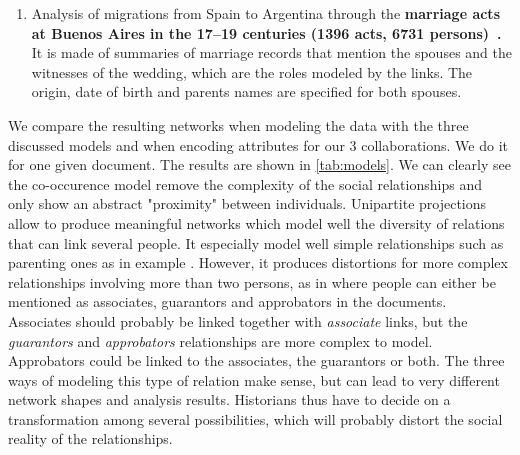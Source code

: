\begin{enumerate}[nosep,leftmargin=*]
    \item Analysis of migrations from Spain to Argentina through the \textbf{marriage acts at Buenos Aires in the 17--19 centuries (1396 acts, 6731 persons)~\cite{moutoukias2016buenos, rueda1989matrimonios}.}
    It is made of summaries of marriage records that mention the spouses and the witnesses of the wedding, which are the roles modeled by the links. The origin, date of birth and parents names are specified for both spouses.
\end{enumerate}

We compare the resulting networks when modeling the data with the three discussed models and when encoding attributes for our 3 collaborations. We do it for one given document.
The results are shown in \autoref{tab:models}.
We can clearly see the co-occurence model remove the complexity of the social relationships and only show an abstract "proximity" between individuals.
Unipartite projections allow to produce meaningful networks which model well the diversity of relations that can link several people. It especially model well simple relationships such as parenting ones as in example \nicole. However, it produces distortions for more complex relationships involving more than two persons, as in \pascal where people can either be mentioned as associates, guarantors and approbators in the documents. Associates should probably be linked together with \textit{associate} links, but the \textit{guarantors} and \textit{approbators} relationships are more complex to model. Approbators could be linked to the associates, the guarantors or both. The three ways of modeling this type of relation make sense, but can lead to very different network shapes and analysis results. Historians thus have to decide on a transformation among several possibilities, which will probably distort the social reality of the relationships.

